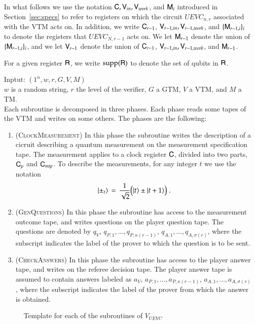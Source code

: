 In what follows we use the notation ${\mathsf{C}},{\mathsf{V}}_{in},{\mathsf{V}}_{work}$, and ${\mathsf{M}}_i$ introduced in Section~\ref{sec:specs} to refer to registers on which the circuit $UEVC_{n,r}$ associated with the VTM acts on. In addition, we write ${\mathsf{C}}_{r-1}$, ${\mathsf{V}}_{r-1,in},{\mathsf{V}}_{r-1,work}$, and $\{ {\mathsf{M}}_{r-1,i} \}_i$ to denote the registers that $UEVC_{N,r-1}$ acts on. We let ${\mathsf{M}}_{r-1}$ denote the union of $\{ {\mathsf{M}}_{r-1,i} \}_i$, and we let ${\mathsf{V}}_{r-1}$ denote the union of ${\mathsf{C}}_{r-1}$, ${\mathsf{V}}_{r-1,in},{\mathsf{V}}_{r-1,work}$, and ${\mathsf{M}}_{r-1}$. 

For a given register ${\mathsf{R}}$, we write $\operatorname{supp}({\mathsf{R}})$ to denote the set of qubits in ${\mathsf{R}}$.






\vspace{10pt}
\begin{center}
\begin{mdframed}
Inptut: $(1^n,w,r,G,V,M)$\\
  $w$ is a random string, $r$ the level of the verifier, $G$ a GTM, $V$ a VTM, and $M$ a TM.\\
Each subroutine is decomposed in three phases. Each phase reads some tapes of the VTM and writes on some others. The phases are the following: 
	\begin{enumerate}
		\item (\textsc{ClockMeasurement}) In this phase the subroutine writes the description of a cicruit describing a quantum measurement on the measurement specification tape. The measurement applies to a clock register ${\mathsf{C}}$, divided into two parts, ${\mathsf{C}}_{p}$ and ${\mathsf{C}}_{mip}$. To describe the measurements, for any integer $t$ we use the notation 
$$|\pm_t\rangle \,=\, \frac{1}{\sqrt{2}}\big(|t\rangle\pm|t+1\rangle\big)\;.$$
	\item (\textsc{GenQuestions}) In this phase the subroutine has access to the measurement outcome tape, and writes questions on the player question tape. The questions are denoted  by $q_V$, $q_{P,1},\ldots,q_{P,\kappa(r-1)}$, $q_{A,1},\ldots,q_{A,\sigma(r)}$, where the subscript indicates the label of the prover to which the question is to be sent. 
		\item (\textsc{CheckAnswers}) In this phase the subroutine has access to the player answer tape, and writes on the referee decision tape. The player answer tape is assumed to contain answers labeled as $a_V$, $a_{P,1},\ldots,a_{P,\kappa(r-1)}$, $a_{A,1},\ldots,a_{A,\sigma(r)}$, where the subscript indicates the label of the prover from which the answer is obtained.
	\end{enumerate}    
\end{mdframed}

\end{center}
\begin{figure}[H]
\caption{Template for each of the subroutines of $V_{UEVC}$}
\label{fig:check_structure}
\end{figure}





